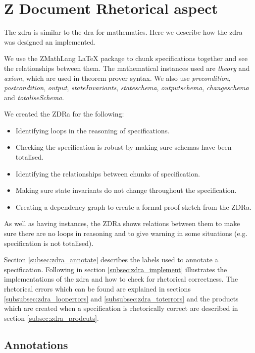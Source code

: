 \chapter{Z Document Rhetorical aspect}
\label{ch:zdra}
The \gls{zdra} is similar to the \gls{dra} for mathematics. Here we describe how the \gls{zdra} was designed an implemented. 

We use the ZMathLang \LaTeX{} package to chunk specifications together and see the relationships between them. The mathematical instances used are \textit{theory} and \textit{axiom}, which are used in theorem prover syntax. We also use \textit{precondition}, \textit{postcondition}, \textit{output}, \textit{stateInvariants}, \textit{stateschema}, \textit{outputschema}, \textit{changeschema} and \textit{totaliseSchema}.

We created the ZDRa for the following:

\begin{itemize}

\item Identifying loops in the reasoning of specifications.
\item Checking the specification is robust by making sure schemas have been totalised.
\item Identifying the relationships between chunks of specification.
\item Making sure state invariants do not change throughout the specification.
\item Creating a dependency graph to create a formal proof sketch from the ZDRa.
\end{itemize}

As well as having instances, the ZDRa shows relations between them to make sure there are no loops in reasoning and to give warning in some situations (e.g. specification is not totalised).

Section \ref{subsec:zdra_annotate} describes the labels used to annotate a specification. Following in section \ref{subsec:zdra_implement} illustrates the implementations of the \gls{zdra} and how to check for rhetorical correctness. The rhetorical errors which can be found are explained in sections \ref{subsubsec:zdra_looperrors} and \ref{subsubsec:zdra_toterrors} and the products which are created when a specification is rhetorically correct are described in section \ref{subsec:zdra_prodcuts}.

\section{Annotations}
\label{sec:zdra_annotate}

